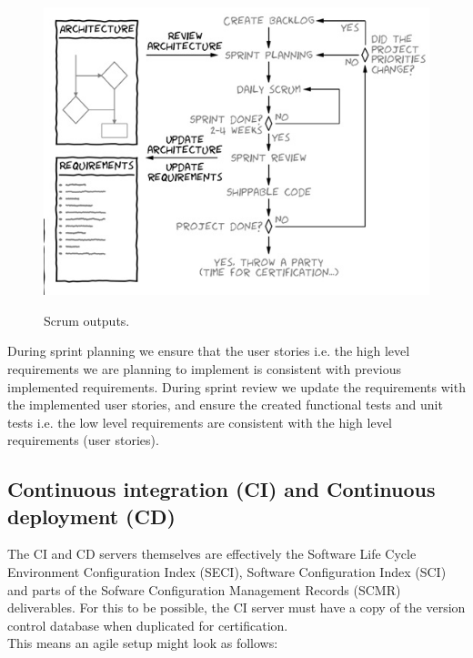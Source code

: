 \documentclass[a4paper]{article}
\begin{document}
\begin{figure}
\includegraphics[width=1\linewidth]{./pictures/scrum.jpg}\\
\caption{\label{fig:Scrum}Scrum outputs.}
\end{figure}


During sprint planning we ensure that the user stories i.e. the high level requirements we are planning to implement is consistent with previous implemented requirements. During sprint review we update the requirements with the implemented user stories, and ensure the created functional tests and unit tests i.e. the low level requirements are consistent with the high level requirements (user stories).
\newpage


\subsection{Continuous integration (CI) and Continuous deployment (CD)}

The CI and CD servers themselves are effectively the Software Life Cycle Environment Configuration Index (SECI), Software Configuration Index (SCI) and parts of the Sofware Configuration Management Records (SCMR) deliverables. For this to be possible, the CI server must have a copy of the version control database when duplicated for certification. \\
This means an agile setup might look as follows: \\
\end{document}
